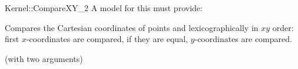 \begin{ccRefFunctionObjectConcept}{Kernel::CompareXY_2}
A model for this must provide:


      {Compares the Cartesian coordinates of points  and
        lexicographically in $xy$ order: first 
       $x$-coordinates are compared, if they are equal, $y$-coordinates
       are compared.}

\ccRefines
{} (with two arguments)

\ccSeeAlso
{} \\
 \\

\end{ccRefFunctionObjectConcept}
